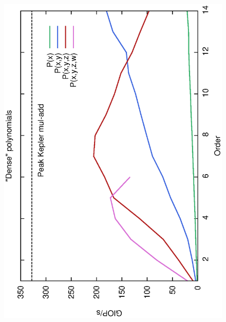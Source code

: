 \documentclass[oribibl,a4paper]{llncs2e/llncs}
\begin{document}
\begin{itemize}
\begin{figure}[t!]
    \centering
    \mbox{
        \hspace{-0.5cm}
        \includegraphics[scale=0.37, angle=-90]{ME128MIPS.eps} 
        \hspace{-0.4cm}
}
\end{figure}
\end{itemize}
\end{document}
